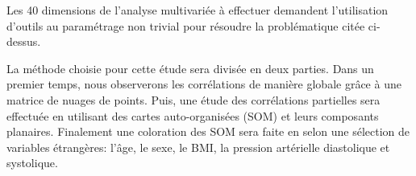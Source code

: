	Les 40 dimensions de l'analyse multivariée à effectuer demandent l'utilisation d'outils au paramétrage non trivial pour résoudre la problématique citée ci-dessus.

	La méthode choisie pour cette étude sera divisée en deux parties. Dans un premier temps, nous observerons les corrélations de manière globale grâce à une matrice de nuages de points. Puis, une étude des corrélations partielles sera effectuée en utilisant des cartes auto-organisées (SOM) et leurs composants planaires. Finalement une coloration des SOM sera faite en selon une sélection de variables étrangères: l'âge, le sexe, le BMI, la pression artérielle diastolique et systolique.

